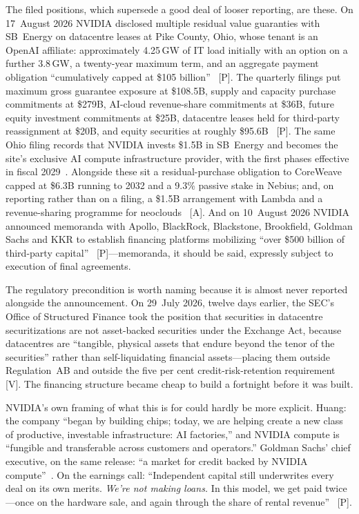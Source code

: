 The filed positions, which supersede a good deal of looser reporting, are these. On 17~August 2026 NVIDIA disclosed multiple residual value guaranties with SB~Energy on datacentre leases at Pike County, Ohio, whose tenant is an OpenAI affiliate: approximately 4.25\,GW of IT load initially with an option on a further 3.8\,GW, a twenty-year maximum term, and an aggregate payment obligation ``cumulatively capped at \$105 billion''~\cite{nvda-ohio} [P]. The quarterly filings put maximum gross guarantee exposure at \$108.5B, supply and capacity purchase commitments at \$279B, AI-cloud revenue-share commitments at \$36B, future equity investment commitments at \$25B, datacentre leases held for third-party reassignment at \$20B, and equity securities at roughly \$95.6B~\cite{nvda-exposure} [P]. The same Ohio filing records that NVIDIA invests \$1.5B in SB~Energy and becomes the site's exclusive AI compute infrastructure provider, with the first phases effective in fiscal 2029~\cite{nvda-ohio}. Alongside these sit a residual-purchase obligation to CoreWeave capped at \$6.3B running to 2032 and a 9.3\% passive stake in Nebius; and, on reporting rather than on a filing, a \$1.5B arrangement with Lambda and a revenue-sharing programme for neoclouds~\cite{nvda-backstop} [A]. And on 10~August 2026 NVIDIA announced memoranda with Apollo, BlackRock, Blackstone, Brookfield, Goldman Sachs and KKR to establish financing platforms mobilizing ``over \$500 billion of third-party capital''~\cite{nvda-500b} [P]---memoranda, it should be said, expressly subject to execution of final agreements.

The regulatory precondition is worth naming because it is almost never reported alongside the announcement. On 29~July 2026, twelve days earlier, the SEC's Office of Structured Finance took the position that securities in datacentre securitizations are not asset-backed securities under the Exchange Act, because datacentres are ``tangible, physical assets that endure beyond the tenor of the securities'' rather than self-liquidating financial assets---placing them outside Regulation~AB and outside the five per cent credit-risk-retention requirement~\cite{sec-dcs} [V]. The financing structure became cheap to build a fortnight before it was built.

NVIDIA's own framing of what this is for could hardly be more explicit. Huang: the company ``began by building chips; today, we are helping create a new class of productive, investable infrastructure: AI factories,'' and NVIDIA compute is ``fungible and transferable across customers and operators.'' Goldman Sachs' chief executive, on the same release: ``a market for credit backed by NVIDIA compute''~\cite{nvda-500b}. On the earnings call: ``Independent capital still underwrites every deal on its own merits. \emph{We're not making loans.} In this model, we get paid twice---once on the hardware sale, and again through the share of rental revenue''~\cite{nvda-defence} [P].

